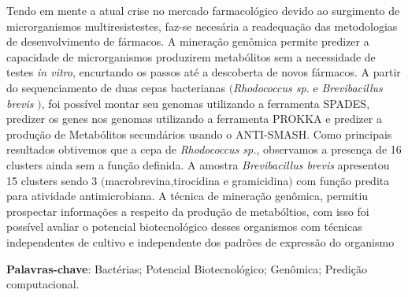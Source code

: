 \setlength{\absparsep}{18pt} %
\begin{resumo}

Tendo em mente a atual crise no mercado farmacológico devido ao surgimento de microrganismos
multiresistestes, faz-se necesária a readequação das metodologias de desenvolvimento de fármacos.
A mineração genômica permite predizer a capacidade de microrganismos produzirem
metabólitos sem a necessidade de testes \textit{in vitro}, encurtando os passos
até a descoberta de novos fármacos. A partir do sequenciamento de duas cepas
bacterianas $($\textit{Rhodococcus sp.} e \textit{Brevibacillus brevis} $)$, foi 
possível montar seu genomas utilizando a ferramenta SPADES, predizer os genes nos
genomas utilizando a ferramenta PROKKA e predizer a produção de Metabólitos 
secundários usando o ANTI-SMASH.  Como principais resultados obtivemos que a cepa
de \textit{Rhodococcus sp.}, observamos a presença de 16 clusters ainda sem a função definida.
A amostra \textit{Brevibacillus brevis} apresentou 15 clusters sendo 3 $($macrobrevina,tirocidina e gramicidina$)$ com função predita
para atividade antimicrobiana. A técnica de mineração genômica, permitiu prospectar informações
a respeito da produção de metabóltios, com isso foi possível avaliar o potencial biotecnológico
desses organismos com técnicas independentes de cultivo e independente dos 
padrões de expressão do organismo

\vspace{\onelineskip}
\noindent 
\textbf{Palavras-chave}: Bactérias; Potencial Biotecnológico; Genômica; Predição computacional.

\end{resumo}

